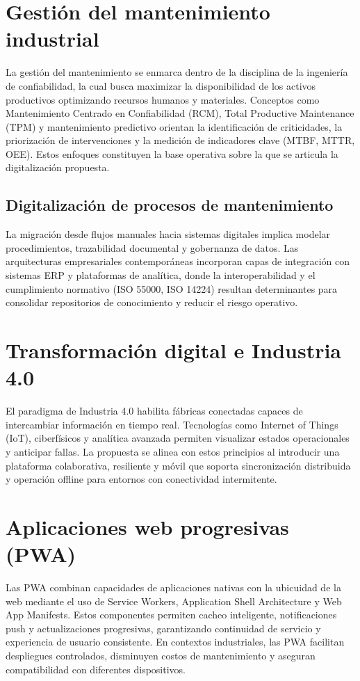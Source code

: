 \documentclass[12pt,a4paper]{report}
\begin{document}
\section*{Gestión del mantenimiento industrial}
La gestión del mantenimiento se enmarca dentro de la disciplina de la ingeniería de confiabilidad, la cual busca maximizar la disponibilidad de los activos productivos optimizando recursos humanos y materiales. Conceptos como Mantenimiento Centrado en Confiabilidad (RCM), Total Productive Maintenance (TPM) y mantenimiento predictivo orientan la identificación de criticidades, la priorización de intervenciones y la medición de indicadores clave (MTBF, MTTR, OEE). Estos enfoques constituyen la base operativa sobre la que se articula la digitalización propuesta.

\subsection*{Digitalización de procesos de mantenimiento}
La migración desde flujos manuales hacia sistemas digitales implica modelar procedimientos, trazabilidad documental y gobernanza de datos. Las arquitecturas empresariales contemporáneas incorporan capas de integración con sistemas ERP y plataformas de analítica, donde la interoperabilidad y el cumplimiento normativo (ISO 55000, ISO 14224) resultan determinantes para consolidar repositorios de conocimiento y reducir el riesgo operativo.

\section*{Transformación digital e Industria 4.0}
El paradigma de Industria 4.0 habilita fábricas conectadas capaces de intercambiar información en tiempo real. Tecnologías como Internet of Things (IoT), ciberfísicos y analítica avanzada permiten visualizar estados operacionales y anticipar fallas. La propuesta se alinea con estos principios al introducir una plataforma colaborativa, resiliente y móvil que soporta sincronización distribuida y operación offline para entornos con conectividad intermitente.

\section*{Aplicaciones web progresivas (PWA)}
Las PWA combinan capacidades de aplicaciones nativas con la ubicuidad de la web mediante el uso de Service Workers, Application Shell Architecture y Web App Manifests. Estos componentes permiten cacheo inteligente, notificaciones push y actualizaciones progresivas, garantizando continuidad de servicio y experiencia de usuario consistente. En contextos industriales, las PWA facilitan despliegues controlados, disminuyen costos de mantenimiento y aseguran compatibilidad con diferentes dispositivos.
\end{document}
